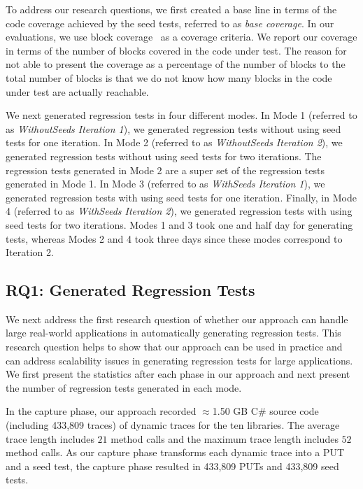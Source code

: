 To address our research questions, we first created a base line in terms
of the code coverage achieved by the seed tests, referred to as \emph{base coverage}. 
In our evaluations, we use block coverage~\cite{} as a coverage 
criteria. We report our coverage in terms of the number of blocks covered in the code under test. The reason
for not able to present the coverage as a percentage
of the number of blocks to the total number of blocks is 
that we do not know how many blocks in the code under test are actually reachable.

We next generated regression tests in four different modes.
In Mode 1 (referred to as \emph{WithoutSeeds Iteration 1}), we generated
regression tests without using seed tests for one iteration. In Mode 2
(referred to as \emph{WithoutSeeds Iteration 2}), we generated regression 
tests without using seed tests for two iterations. The regression tests 
generated in Mode 2 are a super set of the regression tests generated
in Mode 1. In Mode 3 (referred to as \emph{WithSeeds Iteration 1}), 
we generated regression tests with using seed tests for one iteration. Finally, in 
Mode 4 (referred to as \emph{WithSeeds Iteration 2}), we generated
regression tests with using seed tests for two iterations. Modes 1
and 3 took one and half day for generating tests, whereas Modes 2
and 4 took three days since these modes correspond to Iteration 2.

\subsection{RQ1: Generated Regression Tests}

We next address the first research question of whether our approach can 
handle large real-world applications in automatically generating regression
tests. This research question helps to show that our approach can be used 
in practice and can address scalability issues in generating regression tests for large applications.
We first present the statistics after each phase in our approach
and next present the number of regression tests generated in each mode.

In the capture phase, our approach recorded $\approx$1.50 GB C\# source
code (including 433,809 traces) of dynamic traces for the ten libraries.
The average trace length includes $21$ method calls and 
the maximum trace length includes $52$ method calls. As our capture phase transforms 
each dynamic trace into a PUT and a seed test, the capture phase resulted in 433,809
PUTs and 433,809 seed tests. 


